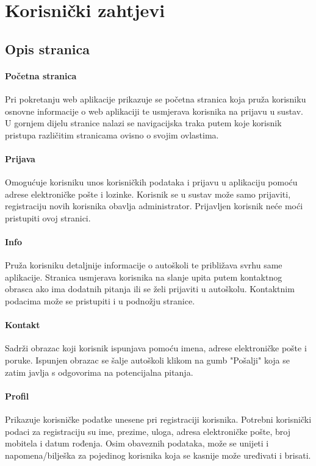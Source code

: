 \chapter{Korisnički zahtjevi}
\section{Opis stranica}
\subsubsection{Početna stranica}
Pri pokretanju web aplikacije prikazuje se početna stranica koja pruža korisniku osnovne informacije o web aplikaciji te usmjerava korisnika na prijavu u sustav. U gornjem dijelu stranice nalazi se navigacijska traka putem koje korisnik pristupa različitim stranicama ovisno o svojim ovlastima. 
\subsubsection{Prijava}
Omogućuje korisniku unos korisničkih podataka i prijavu u aplikaciju pomoću adrese elektroničke pošte i lozinke. Korisnik se u sustav može samo prijaviti, registraciju novih korisnika obavlja administrator. Prijavljen korisnik neće moći pristupiti ovoj stranici.
\subsubsection{Info}
Pruža korisniku detaljnije informacije o autoškoli te približava svrhu same aplikacije. Stranica usmjerava korisnika na slanje upita putem kontaktnog obrasca ako ima dodatnih pitanja ili se želi prijaviti u autoškolu. Kontaktnim podacima može se pristupiti i u podnožju stranice.
\subsubsection{Kontakt}
Sadrži obrazac koji korisnik ispunjava pomoću imena, adrese elektroničke pošte i poruke. Ispunjen obrazac se šalje autoškoli klikom na gumb "Pošalji" koja se zatim javlja s odgovorima na potencijalna pitanja.
\subsubsection{Profil}
Prikazuje korisničke podatke unesene pri registraciji korisnika. Potrebni korisnički podaci za registraciju su ime, prezime, uloga, adresa elektroničke pošte, broj mobitela i datum rođenja. Osim obaveznih podataka, može se unijeti i napomena/bilješka za pojedinog korisnika koja se kasnije može uređivati i brisati.
